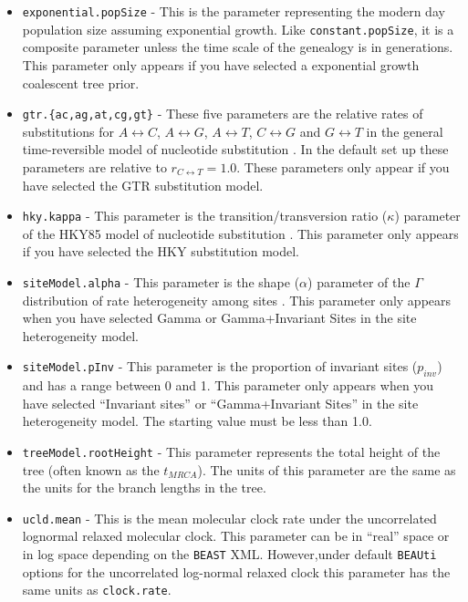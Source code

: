 \documentclass[cup7b, english]{cupbook}
\begin{document}
\begin{itemize}
\item \texttt{exponential.popSize} - This is the parameter representing the modern day population size
assuming exponential growth. Like \texttt{constant.popSize}, it is a composite parameter unless the time scale of the
genealogy is in generations. This parameter only appears if you have selected a exponential growth coalescent tree
prior.

\item \texttt{gtr.\{ac,ag,at,cg,gt\}} -	 These five parameters are the relative rates of substitutions for
$A{\leftrightarrow}C$,  $A{\leftrightarrow}G$,  $A{\leftrightarrow}T$,  $C{\leftrightarrow}G$ and  $G{\leftrightarrow}T$
in the general time-reversible model of nucleotide substitution \cite{ROMM1990}. In the default set up these parameters
are relative to $r_{C{\leftrightarrow}T} = 1.0$. These parameters only appear if you have selected the GTR substitution
model.

\item \texttt{hky.kappa} - This parameter is the transition/transversion ratio ($\kappa$) parameter of the
HKY85 model of nucleotide substitution \cite{HKY1985}. This parameter only appears if you have selected the HKY
substitution model.

\item \texttt{siteModel.alpha} -	 This parameter is the shape ($\alpha$) parameter of the $\Gamma$
distribution of rate heterogeneity among sites \cite{Y1994}. This parameter only appears when you have selected Gamma
or Gamma+Invariant Sites in the site heterogeneity model.

\item \texttt{siteModel.pInv} -	 This parameter is the proportion of  invariant sites ($p_{inv}$) and has a
range between 0 and 1. This parameter only appears when you have selected ``Invariant sites'' or ``Gamma+Invariant Sites'' in
the site heterogeneity model. The starting value must be less than 1.0.

\item \texttt{treeModel.rootHeight} -	 This parameter represents the total height of the tree (often known as
the $t_{MRCA}$). The units of this parameter are the same as the units for the branch lengths in the tree.

\item \texttt{ucld.mean} - This is the mean molecular clock rate under the uncorrelated lognormal relaxed
molecular clock. This parameter can be in ``real'' space or in log space depending on the \texttt{BEAST} XML. However,under default
\texttt{BEAUti} options for the uncorrelated log-normal relaxed clock this parameter has the same units as \texttt{clock.rate}.


\end{itemize}
\end{document}
